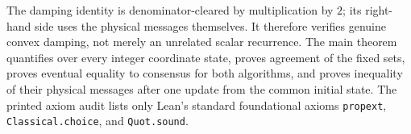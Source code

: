 \documentclass[11pt]{article}
\begin{document}
The damping identity is denominator-cleared by multiplication by $2$;
its right-hand side uses the physical messages themselves. It therefore
verifies genuine convex damping, not merely an unrelated scalar recurrence.
The main theorem quantifies over every integer coordinate state, proves
agreement of the fixed sets, proves eventual equality to consensus for
both algorithms, and proves inequality of their physical messages after
one update from the common initial state. The printed axiom audit lists
only Lean's standard foundational axioms
\texttt{propext}, \texttt{Classical.choice}, and \texttt{Quot.sound}.
\end{document}
